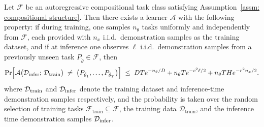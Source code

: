 \begin{theorem}\label{appendix thm:exponential task generalization}
Let $\mathcal{F}$ be an autoregressive compositional task class satisfying Assumption~\ref{assm: compositional structure}. Then there exists a learner $\mathcal{A}$ with the following property: if during training, one samples $n_{\theta}$ tasks uniformly and independently from $\mathcal{F}$, each provided with $n_x$ i.i.d.\ demonstration samples as the training dataset, and if at inference one observes $\ell$
i.i.d.\ demonstration samples from a previously unseen task $P_{\tilde{\theta}}\in\mathcal{F}$, then
\[
\Pr\Bigl[
  \mathcal{A}\bigl(\mathcal{D}_{\mathrm{infer}};\,\mathcal{D}_{\mathrm{train}}\bigr)
  \;\neq\;
  \bigl(P_{\tilde{\theta}_1}, \dots, P_{\tilde{\theta}_T}\bigr)
\Bigr]
\;\le\; D Te^{-n_\theta/D} + n_\theta T e^{-c^2\ell/2} + n_\theta THe^{-r^2 n_x/2}.
\]
where ${\mathcal{D}}_{\mathrm{train}}$ and ${\mathcal{D}}_{\mathrm{infer}}$ denote the training dataset and inference-time demonstration samples respectively, and the probability is taken over the random selection of training tasks 
$\mathcal{F}_{\mathrm{train}} \subseteq \mathcal{F}$, 
the training data $\mathcal{D}_{\mathrm{train}}$, 
and the inference time demonstration samples $\mathcal{D}_{\mathrm{infer}}$. 
\end{theorem}

